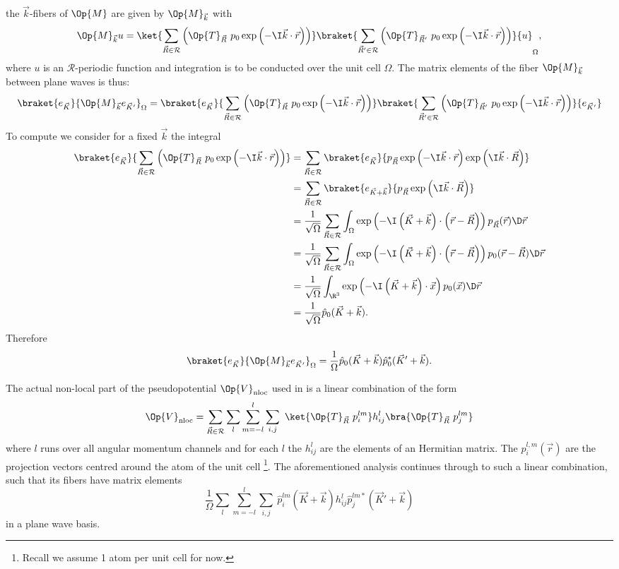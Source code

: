 \documentclass{MFHarticle}
\begin{document}
the $\vec{k}$-fibers of $\Op{M}$ are given by $\Op{M}_{\vec{k}}$ with
\[\Op{M}_{\vec{k}} u =
\ket{
\sum_{\vec{R} \in \mathcal{R}}
\left(
\Op{T}_{\vec{R}}\
p_0 \exp\left(-\I \vec{k} \cdot \vec{r}\right)\right)}
\braket{
\sum_{\vec{R}' \in \mathcal{R}}
\left(
\Op{T}_{\vec{R}'}\
p_0 \exp\left(-\I \vec{k} \cdot \vec{r}\right)\right)}
{u}_\Omega,
\]
where $u$ is an $\mathcal{R}$-periodic function
and integration is to be conducted over the unit cell $\Omega$.
The matrix elements of the fiber $\Op{M}_{\vec{k}}$
between plane waves is thus:
\[
\braket{e_{\vec{K}}}{\Op{M}_{\vec{k}} e_{\vec{K}'}}_\Omega
=
\braket{e_{\vec{K}}}{
\sum_{\vec{R} \in \mathcal{R}}
\left(
\Op{T}_{\vec{R}}\
p_0 \exp\left(-\I \vec{k} \cdot \vec{r}\right)\right)}
\braket{
\sum_{\vec{R}' \in \mathcal{R}}
\left(
\Op{T}_{\vec{R}'}\
p_0 \exp\left(-\I \vec{k} \cdot \vec{r}\right)\right)}
{e_{\vec{K}'}}
\]
To compute we consider for a fixed $\vec{k}$ the integral
\begin{align*}
\braket{e_{\vec{K}}}{
\sum_{\vec{R} \in \mathcal{R}}
\left(
\Op{T}_{\vec{R}}\
p_0 \exp\left(-\I \vec{k} \cdot \vec{r}\right)\right)}
&=
\sum_{\vec{R} \in \mathcal{R}}
\braket{e_{\vec{K}}}{p_{\vec{R}} \exp\left(-\I \vec{k} \cdot \vec{r}\right)
\exp\left(\I \vec{k} \cdot \vec{R}\right)} \\
&=
\sum_{\vec{R} \in \mathcal{R}}
\braket{e_{\vec{K} + \vec{k}}}{p_{\vec{R}}
\exp\left(\I \vec{k} \cdot \vec{R}\right)} \\
&= \frac1{\sqrt{\Omega}}
\sum_{\vec{R} \in \mathcal{R}}
\int_\Omega
\exp\left(-\I \left( \vec{K} + \vec{k} \right)
\cdot \left(\vec{r} - \vec{R}\right)\right)
p_{\vec{R}}(\vec{r}) \D\vec{r} \\
&= \frac1{\sqrt{\Omega}}
\sum_{\vec{R} \in \mathcal{R}}
\int_\Omega
\exp\left(-\I \left( \vec{K} + \vec{k} \right)
\cdot \left(\vec{r} - \vec{R}\right)\right)
p_0(\vec{r} - \vec{R}) \D\vec{r} \\
&= \frac1{\sqrt{\Omega}}
\int_{\R^3}
\exp\left(-\I \left( \vec{K} + \vec{k} \right)
\cdot \vec{x}\right)
p_0(\vec{x}) \D\vec{r} \\
&= \frac1{\sqrt{\Omega}} \hat{p}_0(\vec{K} + \vec{k}).
\end{align*}
Therefore
\[
\braket{e_{\vec{K}}}{\Op{M}_{\vec{k}} e_{\vec{K}'}}_\Omega
=\frac1{\Omega} \hat{p}_0(\vec{K} + \vec{k}) \hat{p}_0^\ast(\vec{K}' + \vec{k}).
\]

The actual non-local part of the pseudopotential
$\Op{V}_\text{nloc}$ used in \cite{Goedecker1996,Hartwigsen1998}
is a linear combination of the form
\[
	\Op{V}_\text{nloc} =
	\sum_{\vec{R} \in \mathcal{R}}
	\sum_{l}
	\sum_{m=-l}^l
	\sum_{i,j}\
	\ket{\Op{T}_{\vec{R}}\ p_i^{lm}} h_{ij}^l \bra{\Op{T}_{\vec{R}}\ p_j^{lm}}
\]
where $l$ runs over all angular momentum channels and
for each $l$ the $h_{ij}^l$
are the elements of an Hermitian matrix.
The $p_i^{l,m}(\vec{r})$ are the projection vectors
centred around the atom of the unit cell%
\footnote{Recall we assume 1 atom per unit cell for now.}.
The aforementioned analysis continues through to such a linear combination,
such that its fibers have matrix elements
\[
	\frac1{\Omega}
	\sum_{l}
	\sum_{m=-l}^l
	\sum_{i,j}\
	\hat{p}_i^{lm}(\vec{K} + \vec{k})
	h_{ij}^l
	\hat{p}_j^{lm \ast}(\vec{K}' + \vec{k})
\]
in a plane wave basis.
\end{document}
